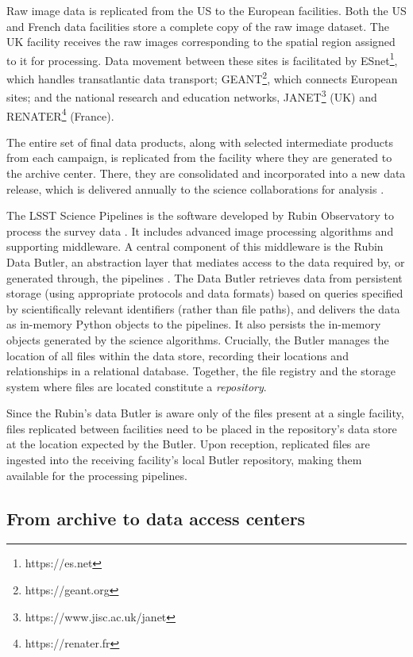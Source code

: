 \documentclass{webofc}
\begin{document}
Raw image data is replicated from the US to the European facilities. Both the US and French data facilities store a complete copy of the raw image dataset. The UK facility receives the raw images corresponding to the spatial region assigned to it for processing. Data movement between these sites is facilitated by ESnet\footnote{https://es.net}, which handles transatlantic data transport; GEANT\footnote{https://geant.org}, which connects European sites; and the national research and education networks, JANET\footnote{https://www.jisc.ac.uk/janet} (UK) and RENATER\footnote{https://renater.fr} (France).

The entire set of final data products, along with selected intermediate products from each campaign, is replicated from the facility where they are generated to the archive center. There, they are consolidated and incorporated into a new data release, which is delivered annually to the science collaborations for analysis \cite{10.1051_epjconf_202429501042}.

The LSST Science Pipelines is the software developed by Rubin Observatory to process the survey data \cite{bosch-pipelines}. It includes advanced image processing algorithms and supporting middleware. A central component of this middleware is the Rubin Data Butler, an abstraction layer that mediates access to the data required by, or generated through, the pipelines \cite{2022SPIE12189E..11J}. The Data Butler retrieves data from persistent storage (using appropriate protocols and data formats) based on queries specified by scientifically relevant identifiers (rather than file paths), and delivers the data as in-memory Python objects to the pipelines. It also persists the in-memory objects generated by the science algorithms. Crucially, the Butler manages the location of all files within the data store, recording their locations and relationships in a relational database. Together, the file registry and the storage system where files are located constitute a \emph{repository}.

Since the Rubin's data Butler is aware only of the files present at a single facility, files replicated between facilities need to be placed in the repository's data store at the location expected by the Butler. Upon reception, replicated files are ingested into the receiving facility's local Butler repository, making them available for the processing pipelines.


\subsection{From archive to data access centers}
\label{summit-to-data-access-centers}
\end{document}
